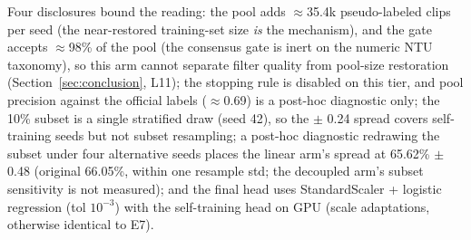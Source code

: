 Four disclosures bound the reading: the pool adds $\approx$35.4k pseudo-labeled clips per seed (the near-restored training-set size \emph{is} the mechanism), and the gate accepts $\approx$98\% of the pool (the consensus gate is inert on the numeric NTU taxonomy), so this arm cannot separate filter quality from pool-size restoration (Section~\ref{sec:conclusion}, L11); the stopping rule is disabled on this tier, and pool precision against the official labels ($\approx$0.69) is a post-hoc diagnostic only; the 10\% subset is a single stratified draw (seed 42), so the $\pm$ 0.24 spread covers self-training seeds but not subset resampling; a post-hoc diagnostic redrawing the subset under four alternative seeds places the linear arm's spread at 65.62\% $\pm$ 0.48 (original 66.05\%, within one resample std; the decoupled arm's subset sensitivity is not measured); and the final head uses StandardScaler + logistic regression (tol $10^{-3}$) with the self-training head on GPU (scale adaptations, otherwise identical to E7).

